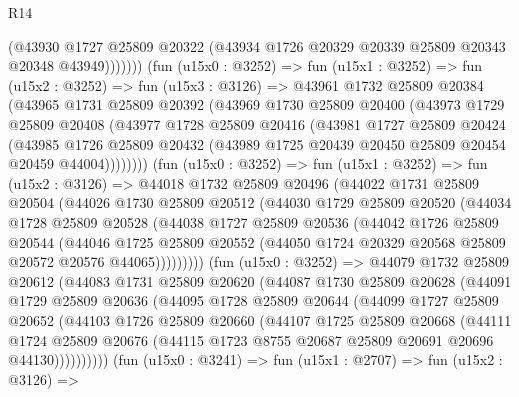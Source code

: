 \begin{lexlean}{R14}
\begin{coremodule}
              (@43930
                @1727
                @25809
                @20322
                (@43934 @1726 @20329 @20339 @25809 @20343 @20348 @43949)))))))
    (fun (u15x0 : @3252) =>
    fun (u15x1 : @3252) =>
    fun (u15x2 : @3252) =>
    fun (u15x3 : @3126) =>
    @43961
      @1732
      @25809
      @20384
      (@43965
        @1731
        @25809
        @20392
        (@43969
          @1730
          @25809
          @20400
          (@43973
            @1729
            @25809
            @20408
            (@43977
              @1728
              @25809
              @20416
              (@43981
                @1727
                @25809
                @20424
                (@43985
                  @1726
                  @25809
                  @20432
                  (@43989 @1725 @20439 @20450 @25809 @20454 @20459 @44004))))))))
    (fun (u15x0 : @3252) =>
    fun (u15x1 : @3252) =>
    fun (u15x2 : @3126) =>
    @44018
      @1732
      @25809
      @20496
      (@44022
        @1731
        @25809
        @20504
        (@44026
          @1730
          @25809
          @20512
          (@44030
            @1729
            @25809
            @20520
            (@44034
              @1728
              @25809
              @20528
              (@44038
                @1727
                @25809
                @20536
                (@44042
                  @1726
                  @25809
                  @20544
                  (@44046
                    @1725
                    @25809
                    @20552
                    (@44050 @1724 @20329 @20568 @25809 @20572 @20576 @44065)))))))))
    (fun (u15x0 : @3252) =>
    @44079
      @1732
      @25809
      @20612
      (@44083
        @1731
        @25809
        @20620
        (@44087
          @1730
          @25809
          @20628
          (@44091
            @1729
            @25809
            @20636
            (@44095
              @1728
              @25809
              @20644
              (@44099
                @1727
                @25809
                @20652
                (@44103
                  @1726
                  @25809
                  @20660
                  (@44107
                    @1725
                    @25809
                    @20668
                    (@44111
                      @1724
                      @25809
                      @20676
                      (@44115 @1723 @8755 @20687 @25809 @20691 @20696 @44130))))))))))
    (fun (u15x0 : @3241) =>
    fun (u15x1 : @2707) =>
    fun (u15x2 : @3126) =>

\end{coremodule}
\end{lexlean}
